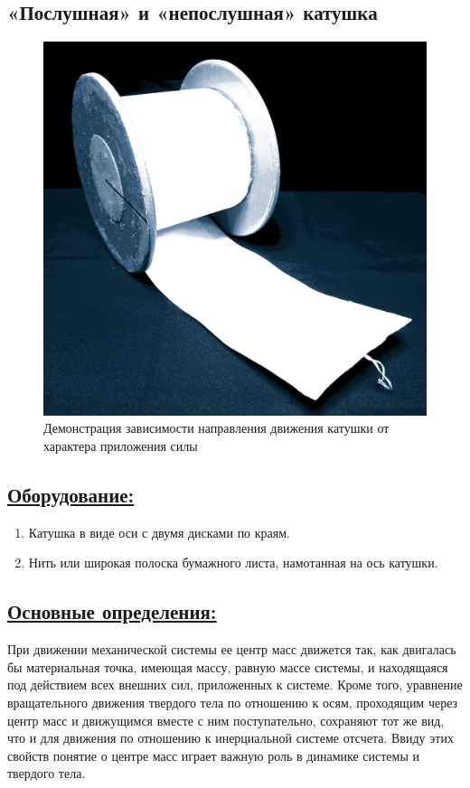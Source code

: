 \documentclass[14pt,a4paper,oneside]{extarticle}	%
\begin{document}

\begin{center}
	\subsection*{«Послушная» и  «непослушная» катушка}
\end{center}

\begin{figure}[H] 
	\centering 	
	\includegraphics[width=0.6\linewidth]{roll-1.png}
	\caption{Демонстрация зависимости направления движения катушки от характера приложения силы}
	\label{roll-1}
\end{figure}

\subsection*{\underline{Оборудование:}}

\begin{enumerate}
	\item Катушка в виде оси с двумя дисками по краям.
	\item Нить или широкая полоска бумажного листа, намотанная на ось катушки.
\end{enumerate}

\newpage
\subsection*{\underline{Основные определения:}}

При движении механической системы ее центр масс движется так, как двигалась бы материальная точка, имеющая массу, равную массе системы, и находящаяся под действием всех внешних сил, приложенных к системе. 
Кроме того, уравнение вращательного движения твердого тела по отношению к осям, проходящим через центр масс и движущимся вместе с ним поступательно, сохраняют тот же вид, что и для движения по отношению к инерциальной системе отсчета.
Ввиду этих свойств понятие о центре масс играет важную роль в динамике системы и твердого тела.
\end{document}
